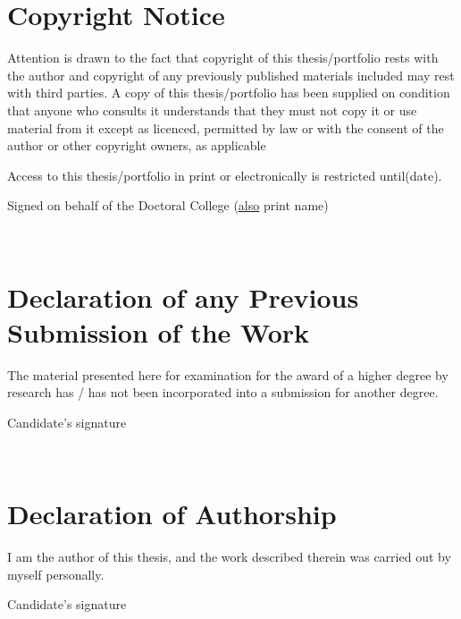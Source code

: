 \section*{Copyright Notice}
Attention is drawn to the fact that copyright of this thesis/portfolio rests with the author and copyright of any previously published materials included may rest with third parties. A copy of this thesis/portfolio has been supplied on condition that anyone who consults it understands that they must not copy it or use material from it except as licenced, permitted by law or with the consent of the author or other copyright owners, as applicable

Access to this thesis/portfolio in print or electronically is restricted until\dotfill (date).

Signed on behalf of the Doctoral College \dotfill (\underline{also} print name)

\ \\
\section*{Declaration of any Previous Submission of the Work}
The material presented here for examination for the award of a higher degree by research has / has not been incorporated into a submission for another degree.
\vspace{1.5cm}

Candidate’s signature \dotfill \hspace{3cm}

\ \\
\section*{Declaration of Authorship}
I am the author of this thesis, and the work described therein was carried out by myself personally.
\vspace{1.5cm}

Candidate’s signature \dotfill \hspace{3cm}
